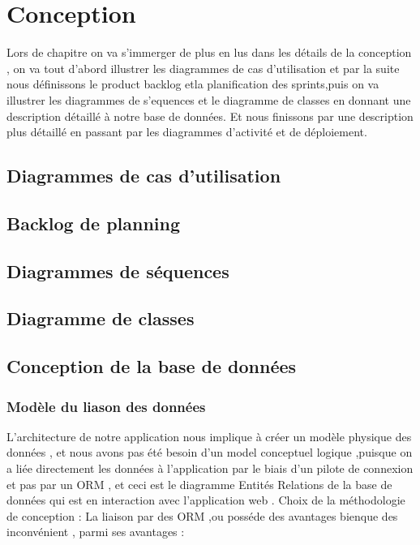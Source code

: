 
\chapter{Conception}

Lors de chapitre on va s'immerger de plus en lus dans les d\'{e}tails de la conception ,
on va tout d'abord illustrer les diagrammes de cas d'utilisation et par la suite nous définissons le product backlog etla planification des sprints,puis on va illustrer les diagrammes de s'{e}quences et le diagramme de classes en donnant une description d\'{e}taill\'{e} à notre base de donn\'{e}es.
Et nous finissons par  une description plus d\'{e}taill\'{e} en passant par les diagrammes d'activit\'{e} et de d\'{e}ploiement.


\section{Diagrammes de cas d'utilisation}



\section{Backlog de planning}




\FloatBarrier

\section{Diagrammes de séquences}




\section{Diagramme de classes }



\section{Conception de la base de donn\'{e}es}

\subsection{Mod\`{e}le du liason des donn\'{e}es }
L'architecture de notre application nous implique \`{a} cr\'{e}er un mod\`{e}le physique
des donn\'{e}es , et nous avons pas \'{e}t\'{e} besoin d'un model conceptuel logique
,puisque on a li\'{e}e directement les donn\'{e}es \`{a} l'application par le biais d'un
pilote de connexion et pas par un ORM , et ceci est le diagramme
Entit\'{e}s \textendash{}Relations de la base de donn\'{e}es qui est en interaction avec
l'application web .
Choix de la m\'{e}thodologie de conception :
La liaison par des ORM ,ou poss\'{e}de des avantages bienque des inconv\'{e}nient ,
parmi ses avantages :

